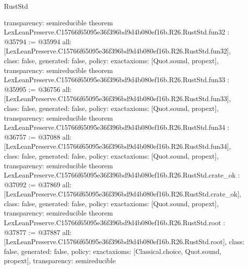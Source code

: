 \begin{lexlean}{RustStd}
\begin{coremodule}
{  transparency: semireducible
}
theorem LexLeanPreserve.C15766f65095e36f396bd9d4b080ef16b.R26.RustStd.fun32 : @35794 := @35994 {
  all: [LexLeanPreserve.C15766f65095e36f396bd9d4b080ef16b.R26.RustStd.fun32],
  class: false,
  generated: false,
  policy: exact{axioms: [Quot.sound, propext]},
  transparency: semireducible
}
theorem LexLeanPreserve.C15766f65095e36f396bd9d4b080ef16b.R26.RustStd.fun33 : @35995 := @36756 {
  all: [LexLeanPreserve.C15766f65095e36f396bd9d4b080ef16b.R26.RustStd.fun33],
  class: false,
  generated: false,
  policy: exact{axioms: [Quot.sound, propext]},
  transparency: semireducible
}
theorem LexLeanPreserve.C15766f65095e36f396bd9d4b080ef16b.R26.RustStd.fun34 : @36757 := @37088 {
  all: [LexLeanPreserve.C15766f65095e36f396bd9d4b080ef16b.R26.RustStd.fun34],
  class: false,
  generated: false,
  policy: exact{axioms: [Quot.sound, propext]},
  transparency: semireducible
}
theorem LexLeanPreserve.C15766f65095e36f396bd9d4b080ef16b.R26.RustStd.crate_ok : @37092 := @37869 {
  all: [LexLeanPreserve.C15766f65095e36f396bd9d4b080ef16b.R26.RustStd.crate_ok],
  class: false,
  generated: false,
  policy: exact{axioms: [Quot.sound, propext]},
  transparency: semireducible
}
theorem LexLeanPreserve.C15766f65095e36f396bd9d4b080ef16b.R26.RustStd.root : @37877 := @37887 {
  all: [LexLeanPreserve.C15766f65095e36f396bd9d4b080ef16b.R26.RustStd.root],
  class: false,
  generated: false,
  policy: exact{axioms: [Classical.choice, Quot.sound, propext]},
  transparency: semireducible
}


\end{coremodule}
\end{lexlean}
